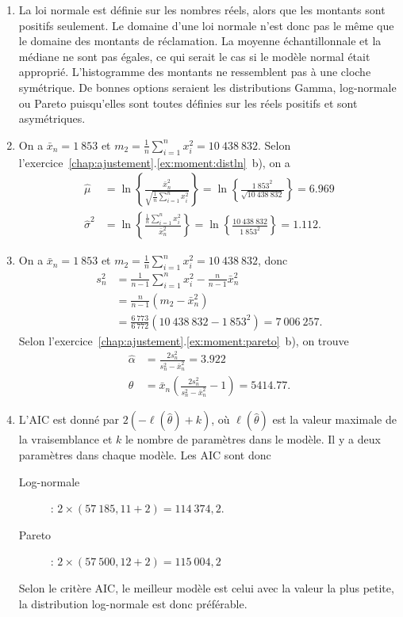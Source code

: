 \begin{solution}{4.16}
\begin{enumerate}

\item La loi normale est définie sur les nombres réels, alors que les montants sont positifs seulement. Le domaine d'une loi normale n'est donc pas le même que le domaine des montants de réclamation. La moyenne échantillonnale et la médiane ne sont pas égales, ce qui serait le cas si le modèle normal était approprié. L'histogramme des montants ne ressemblent pas à une cloche symétrique. De bonnes options seraient les distributions Gamma, log-normale ou Pareto puisqu'elles sont toutes définies sur les réels positifs et sont asymétriques.

\item On a $\bar x_n=1~853$ et $m_2=\frac{1}{n}\sum_{i=1}^n x_i^2 = 10~438~832$. Selon l'exercice~\ref{chap:ajustement}.\ref{ex:moment:distln}~b), on a
\begin{align*}
\hat \mu &= \ln\left\{\frac{\bar x_n^2}{\sqrt{\frac{1}{n}\sum_{i=1}^n x_i^2}} \right\}=\ln\left\{\frac{1~853^2}{\sqrt{10~438~832}} \right\}=6.969\\
\hat\sigma^2 &= \ln\left\{\frac{\frac{1}{n}\sum_{i=1}^n x_i^2}{\bar x_n^2} \right\}=  \ln\left\{\frac{10~438~832}{1~853^2} \right\}=1.112.
\end{align*}


\item On a $\bar x_n=1~853$ et $m_2=\frac{1}{n}\sum_{i=1}^n x_i^2 = 10~438~832$, donc
\begin{align*}
s_n^2&=\frac{1}{n-1}\sum_{i=1}^n x_i^2 - \frac{n}{n-1}\bar x_n^2\\
& = \frac{n}{n-1}(m_2-\bar x_n^2)\\
&=\frac{6~773}{6~772}(10~438~832-1~853^2)=7~006~257.
\end{align*}
Selon l'exercice~\ref{chap:ajustement}.\ref{ex:moment:pareto}~b), on trouve
\begin{align*}
\hat\alpha &= \frac{2s_n^2}{s_n^2-\bar x_n^2}=3.922\\
\hat\theta&=\bar x_n \left(\frac{2s_n^2}{s_n^2-\bar x_n^2} -1\right)=5414.77.
\end{align*}


\item L'AIC est donné par $2(-\ell(\hat\theta)+k)$, où $\ell(\hat\theta)$ est la valeur maximale de la vraisemblance et $k$ le nombre de paramètres dans le modèle. Il y a deux paramètres dans chaque modèle. Les AIC sont donc
\begin{description}
\item[Log-normale]: $2\times(57~185,11+2)=114~374,2$.
\item[Pareto]: $2\times(57~500,12+2)=115~004,2$
\end{description}
Selon le critère AIC, le meilleur modèle est celui avec la valeur la plus petite, la distribution log-normale est donc préférable.


\end{enumerate}
\end{solution}
